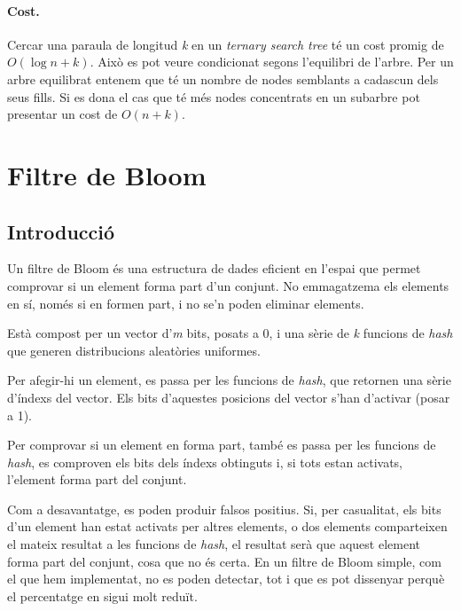 \documentclass[titlepage]{article}
\begin{document}
\paragraph{Cost.} Cercar una paraula de longitud \textit{k} en un \textit{ternary search tree} té un cost promig de 
\begin{math}
    \textit{O}(\log{n + k})
\end{math}.
Això es pot veure condicionat segons l'equilibri de l'arbre. Per un arbre equilibrat entenem que té un nombre de nodes semblants a cadascun dels seus fills. Si es dona el cas que té més nodes concentrats en un subarbre pot presentar un cost de
\begin{math}
    \textit{O}(n + k)
\end{math}.

\clearpage
\section{Filtre de Bloom}
\subsection{Introducció}
Un filtre de Bloom és una estructura de dades eficient en l'espai que permet comprovar si un element forma part d'un conjunt. No emmagatzema els elements en sí, només si en formen part, i no se'n poden eliminar elements.
\newline\par
Està compost per un vector d'\textit{m} bits, posats a 0, i una sèrie de \textit{k} funcions de \textit{hash} que generen distribucions aleatòries uniformes.
\newline\par
Per afegir-hi un element, es passa per les funcions de \textit{hash}, que retornen una sèrie d'índexs del vector. Els bits d'aquestes posicions del vector s'han d'activar (posar a 1).
\newline\par
Per comprovar si un element en forma part, també es passa per les funcions de \textit{hash}, es comproven els bits dels índexs obtinguts i, si tots estan activats, l'element forma part del conjunt.
\newline\par
Com a desavantatge, es poden produir falsos positius. Si, per casualitat, els bits d'un element han estat activats per altres elements, o dos elements comparteixen el mateix resultat a les funcions de \textit{hash}, el resultat serà que aquest element forma part del conjunt, cosa que no és certa. En un filtre de Bloom simple, com el que hem implementat, no es poden detectar, tot i que es pot dissenyar perquè el percentatge en sigui molt reduït. 
\end{document}
